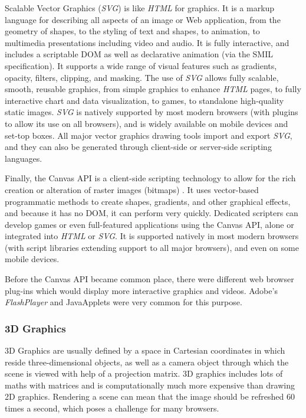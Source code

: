 \documentclass[a4paper,11pt,titlepage]{article}
\begin{document}
Scalable Vector Graphics (\textit{SVG}) is like \textit{HTML} for graphics\cite{svg}. It is a markup language for describing all aspects of an image or Web application, from the geometry of shapes, to the styling of text and shapes, to animation, to multimedia presentations including video and audio. It is fully interactive, and includes a scriptable DOM as well as declarative animation (via the SMIL specification). It supports a wide range of visual features such as gradients, opacity, filters, clipping, and masking.
The use of \textit{SVG} allows fully scalable, smooth, reusable graphics, from simple graphics to enhance \textit{HTML} pages, to fully interactive chart and data visualization, to games, to standalone high-quality static images. \textit{SVG} is natively supported by most modern browsers (with plugins to allow its use on all browsers), and is widely available on mobile devices and set-top boxes. All major vector graphics drawing tools import and export \textit{SVG}, and they can also be generated through client-side or server-side scripting languages.

Finally, the Canvas API is a client-side scripting technology to allow for the rich creation or alteration of raster images (bitmaps) . It uses vector-based programmatic methods to create shapes, gradients, and other graphical effects, and because it has no DOM, it can perform very quickly. Dedicated scripters can develop games or even full-featured applications using the Canvas API, alone or integrated into \textit{HTML} or \textit{SVG}. It is supported natively in most modern browsers (with script libraries extending support to all major browsers), and even on some mobile devices.

Before the Canvas API became common place, there were different web browser plug-ins which would display more interactive graphics and videos. Adobe's \textit{FlashPlayer} and JavaApplets were very common for this purpose.
\subsubsection{3D Graphics}

3D Graphics are usually defined by a space in Cartesian coordinates in which reside three-dimensional objects, as well as a camera object through which the scene is viewed with help of a projection matrix. 3D graphics includes lots of maths with matrices and is computationally much more expensive than drawing 2D graphics. Rendering a scene can mean that the image should be refreshed 60 times a second, which poses a challenge for many browsers.
\end{document}
